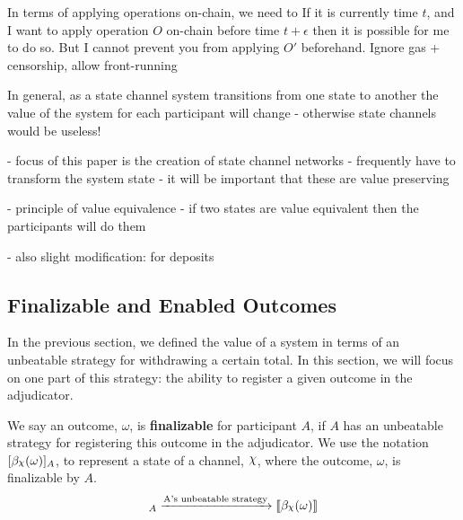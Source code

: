 \documentclass{article}
\DeclareRobustCommand{\rchi}{{\mathpalette\irchi\relax}}
\newcommand{\irchi}[2]{\raisebox{\depth}{$#1\chi$}} %
\theoremstyle{definition}
\newcommand{\adj}[1]{\llbracket #1 \rrbracket}
\newcommand{\enf}[1]{[#1]}
\begin{document}
In terms of applying operations on-chain, we need to
If it is currently time $t$, and I want to apply operation $O$ on-chain before time $t + \epsilon$
then it is possible for me to do so.
But I cannot prevent you from applying $O'$ beforehand.
Ignore gas + censorship, allow front-running

In general, as a state channel system transitions from one state to another the value of the system
for each participant will change - otherwise state channels would be useless!

- focus of this paper is the creation of state channel networks
- frequently have to transform the system state
- it will be important that these are value preserving

- principle of value equivalence - if two states are value equivalent then the participants will do them

- also slight modification: for deposits

\subsection{Finalizable and Enabled Outcomes}

In the previous section, we defined the value of a system in terms of an unbeatable strategy
for withdrawing a certain total.
In this section, we will focus on one part of this strategy: the ability to register a given
outcome in the adjudicator.

We say an outcome, $\omega$, is \textbf{finalizable} for participant $A$, if $A$ has an unbeatable
strategy for registering this outcome in the adjudicator.
We use the notation $\enf{\beta_\rchi(\omega)}_A$, to represent a state of a channel, $\rchi$,
where the outcome, $\omega$, is finalizable by $A$.
\begin{align*}
  \enf{\beta_\rchi(\omega)}_A \xrightarrow{\text{A's unbeatable strategy}} \adj{\beta_\rchi(\omega)}
\end{align*}
\end{document}
